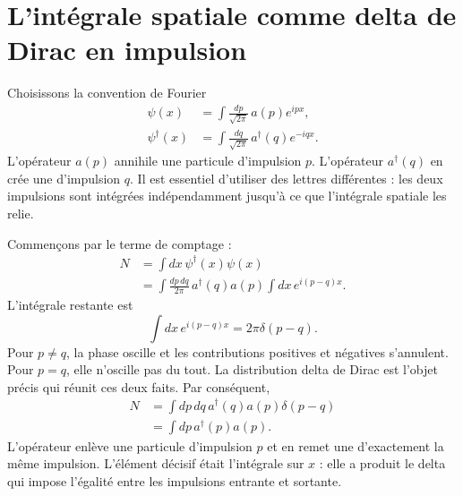 \section{L’intégrale spatiale comme delta de Dirac en impulsion}

Choisissons la convention de Fourier
\begin{align}
\psi(x)&=\int\frac{dp}{\sqrt{2\pi}}\,a(p)e^{ipx},\\
\psi^\dagger(x)&=\int\frac{dq}{\sqrt{2\pi}}\,a^\dagger(q)e^{-iqx}.
\label{eq:l9-field-fourier}
\end{align}
L’opérateur \(a(p)\) annihile une particule d’impulsion \(p\).
L’opérateur \(a^\dagger(q)\) en crée une d’impulsion \(q\). Il est essentiel d’utiliser des lettres différentes : les deux impulsions sont intégrées indépendamment jusqu’à ce que l’intégrale spatiale les relie.

Commençons par le terme de comptage :
\begin{align}
N
&=\int dx\,\psi^\dagger(x)\psi(x)\\
&=\int\frac{dp\,dq}{2\pi}\,
a^\dagger(q)a(p)
\int dx\,e^{i(p-q)x}.
\end{align}
L’intégrale restante est
\begin{equation}
\int dx\,e^{i(p-q)x}=2\pi\delta(p-q).
\end{equation}
Pour \(p\ne q\), la phase oscille et les contributions positives et négatives s’annulent. Pour \(p=q\), elle n’oscille pas du tout. La distribution delta de Dirac est l’objet précis qui réunit ces deux faits. Par conséquent,
\begin{align}
N
&=\int dp\,dq\,a^\dagger(q)a(p)\delta(p-q)\\
&=\int dp\,a^\dagger(p)a(p).
\label{eq:l9-number-momentum}
\end{align}
L’opérateur enlève une particule d’impulsion \(p\) et en remet une d’exactement la même impulsion. L’élément décisif était l’intégrale sur \(x\) : elle a produit le delta qui impose l’égalité entre les impulsions entrante et sortante.

\begin{classroomqa}
\end{classroomqa}

